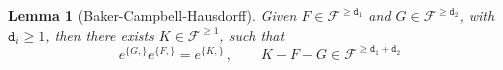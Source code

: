 \documentclass[reqno,11pt]{amsart}
\theoremstyle{plain}
\numberwithin{equation}{section}
\newtheorem{lemma}[theorem]{Lemma}
\newcommand{\ad}{{\rm ad}}
\renewcommand{\ge}{\geq}
\newcommand{\cF}{{\mathcal F}}
\newcommand{\td}{{\mathtt{d}}}
\newcommand{\s}{\sigma}
\renewcommand{\ge}{\gtrsim}
\begin{document}
{\begin{lemma}[Baker-Campbell-Hausdorff]\label{BCH}
	Given   $F\in \cF^{\geq \td_1}$ and  $G\in \cF^{\geq \td_2}$, with $\td_i\geq 1$,  then there exists $K\in \cF^{\geq 1}$, such that
	\[
	e^{\{G,\}}e^{\{F,\}}=  e^{\{ K,\}} \,,\qquad  K-F-G \in  \cF^{ \geq \td_1+\td_2}
	\] 
\end{lemma}
}
\end{document}
